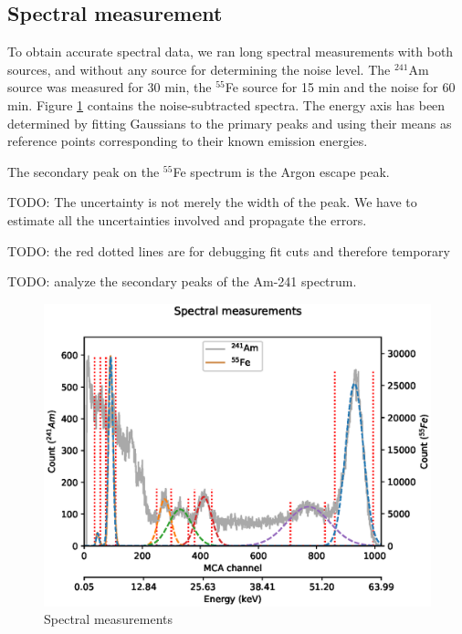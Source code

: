 \documentclass[a4paper]{article}
\newenvironment{todo}{
\color{red}
}
{
}
\begin{document}
\clearpage
\subsection{Spectral measurement}
\label{results_spectral}
To obtain accurate spectral data, we ran long spectral measurements with both sources, and without any source for determining the noise level.
The $^{241}$Am source was measured for 30 min, the $^{55}$Fe source for 15 min and the noise for 60 min.
Figure \ref{fig:spectra} contains the noise-subtracted spectra.
The energy axis has been determined by fitting Gaussians to the primary peaks and using their means as reference points corresponding to their known emission energies.

The secondary peak on the $^{55}$Fe spectrum is the Argon escape peak.

\begin{todo}
TODO: The uncertainty is not merely the width of the peak. We have to estimate all the uncertainties involved and propagate the errors.

TODO: the red dotted lines are for debugging fit cuts and therefore temporary

TODO: analyze the secondary peaks of the Am-241 spectrum.
\end{todo}

\begin{figure}[ht!]
\centering
\includegraphics[width=\textwidth]{fig/python/spectra.eps}
\caption{Spectral measurements}
\label{fig:spectra}
\end{figure}
\end{document}
